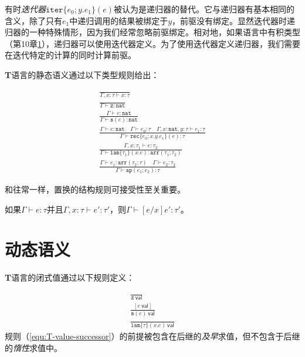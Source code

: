 有时\textit{迭代器}$\mathtt{iter}\{e_0;y.e_1\}(e)$被认为是递归器的替代。它与递归器有基本相同的含义，除了只有$e_1$中递归调用的结果被绑定于$y$，前驱没有绑定。显然迭代器时递归器的一种特殊情形，因为我们经常忽略前驱绑定。相对地，如果语言中有积类型（第10章\ref{}），递归器可以使用迭代器定义。为了使用迭代器定义递归器，我们需要在迭代特定的计算的同时计算前驱。

\textbf{T}语言的静态语义通过以下类型规则给出：

\begin{subequations}
\begin{gather}
\frac{}{\Gamma,x:\tau\vdash x:\tau}\\
\frac{}{\Gamma\vdash\mathtt{z}:\mathtt{nat}}\\
\frac{\Gamma\vdash e:\mathtt{nat}}{\Gamma \vdash \mathtt{s}(e):\mathtt{nat}}\\
\frac{\Gamma \vdash e:\mathtt{nat}\quad\Gamma\vdash e_0:\tau\quad\Gamma,x:\mathtt{nat},y:\tau\vdash e_1:\tau}{\Gamma\vdash\mathtt{rec}\{e_0;x.y.e_1\}(e):\tau}\\
\frac{\Gamma,x:\tau_1\vdash e:\tau_2}{\Gamma\vdash\mathtt{lam}\{\tau_1\}(x.e):\mathtt{arr}(\tau_1;\tau_2)}\\
\frac{\Gamma\vdash e_1:\mathtt{arr}(\tau_2;\tau)\quad\Gamma\vdash e_2:\tau_2}{\Gamma\vdash\mathtt{ap}(e_1;e_2):\tau}
\end{gather}
\end{subequations}

和往常一样，置换的结构规则可接受性至关重要。

\begin{lemma}
如果$\Gamma\vdash e:\tau$并且$\Gamma,x:\tau\vdash e':\tau'$，则$\Gamma\vdash[e/x]e':\tau'$。
\end{lemma}

\section{动态语义}

\textbf{T}语言的闭式值通过以下规则定义：

\begin{subequations}
\begin{gather}
\frac{}{\mathtt{z}\ \mathsf{val}}\\
\frac{[e\ \mathsf{val}]}{\mathtt{s}(e)\ \mathsf{val}}\label{equ:T-value-successor}\\
\frac{}{\mathtt{lam}\{\tau\}(x.e)\ \mathsf{val}}
\end{gather}
\end{subequations}
规则（\ref{equ:T-value-successor}）的前提被包含在后继的\textit{及早}求值，但不包含于后继的\textit{惰性}求值中。

